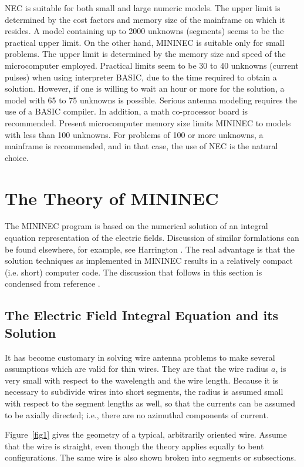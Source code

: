 \documentclass[12pt]{article}
\begin{document}
NEC is suitable for both small and large numeric models. The upper limit
is determined by the cost factors and memory size of the mainframe on
which it resides. A model containing up to 2000 unknowns (segments)
seems to be the practical upper limit. On the other hand, MININEC is
suitable only for small problems. The upper limit is determined by the
memory size and speed of the microcomputer employed. Practical limits
seem to be 30 to 40 unknowns (current pulses) when using interpreter
BASIC, due to the time required to obtain a solution. However, if one is
willing to wait an hour or more for the solution, a model with 65 to 75
unknowns is possible. Serious antenna modeling requires the use of a
BASIC compiler. In addition, a math co-processor board is recommended.
Present microcomputer memory size limits MININEC to models with less
than 100 unknowns. For problems of 100 or more unknowns, a mainframe is
recommended, and in that case, the use of NEC is the natural choice.

\section{The Theory of MININEC}
The MININEC program is based on the numerical solution of an integral
equation representation of the electric fields. Discussion of similar
formlations can be found elsewhere, for example, see Harrington
\cite{r5}. The real advantage is that the solution techniques as
implemented in MININEC results in a relatively compact (i.e. short)
computer code. The discussion that follows in this section is condensed
from reference \cite{r2}.

\subsection{The Electric Field Integral Equation and its Solution}
It has become customary in solving wire antenna problems to make several
assumptions which are valid for thin wires. They are that the wire
radius $a$, is very small with respect to the wavelength and the wire
length. Because it is necessary to subdivide wires into short segments,
the radius is assumed small with respect to the segment lengths as well,
so that the currents can be assumed to be axially directed; i.e., there
are no azimuthal components of current.

Figure~\eqref{fig1} gives the geometry of a typical, arbitrarily oriented
wire. Assume that the wire is straight, even though the theory applies
equally to bent configurations. The same wire is also shown broken into
segments or subsections.
\end{document}
